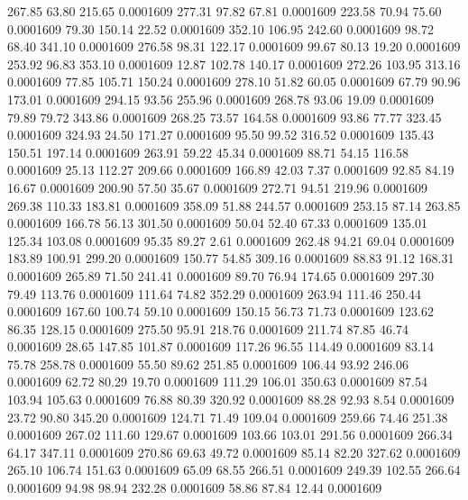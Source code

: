  267.85   63.80  215.65   0.0001609
 277.31   97.82   67.81   0.0001609
 223.58   70.94   75.60   0.0001609
  79.30  150.14   22.52   0.0001609
 352.10  106.95  242.60   0.0001609
  98.72   68.40  341.10   0.0001609
 276.58   98.31  122.17   0.0001609
  99.67   80.13   19.20   0.0001609
 253.92   96.83  353.10   0.0001609
  12.87  102.78  140.17   0.0001609
 272.26  103.95  313.16   0.0001609
  77.85  105.71  150.24   0.0001609
 278.10   51.82   60.05   0.0001609
  67.79   90.96  173.01   0.0001609
 294.15   93.56  255.96   0.0001609
 268.78   93.06   19.09   0.0001609
  79.89   79.72  343.86   0.0001609
 268.25   73.57  164.58   0.0001609
  93.86   77.77  323.45   0.0001609
 324.93   24.50  171.27   0.0001609
  95.50   99.52  316.52   0.0001609
 135.43  150.51  197.14   0.0001609
 263.91   59.22   45.34   0.0001609
  88.71   54.15  116.58   0.0001609
  25.13  112.27  209.66   0.0001609
 166.89   42.03    7.37   0.0001609
  92.85   84.19   16.67   0.0001609
 200.90   57.50   35.67   0.0001609
 272.71   94.51  219.96   0.0001609
 269.38  110.33  183.81   0.0001609
 358.09   51.88  244.57   0.0001609
 253.15   87.14  263.85   0.0001609
 166.78   56.13  301.50   0.0001609
  50.04   52.40   67.33   0.0001609
 135.01  125.34  103.08   0.0001609
  95.35   89.27    2.61   0.0001609
 262.48   94.21   69.04   0.0001609
 183.89  100.91  299.20   0.0001609
 150.77   54.85  309.16   0.0001609
  88.83   91.12  168.31   0.0001609
 265.89   71.50  241.41   0.0001609
  89.70   76.94  174.65   0.0001609
 297.30   79.49  113.76   0.0001609
 111.64   74.82  352.29   0.0001609
 263.94  111.46  250.44   0.0001609
 167.60  100.74   59.10   0.0001609
 150.15   56.73   71.73   0.0001609
 123.62   86.35  128.15   0.0001609
 275.50   95.91  218.76   0.0001609
 211.74   87.85   46.74   0.0001609
  28.65  147.85  101.87   0.0001609
 117.26   96.55  114.49   0.0001609
  83.14   75.78  258.78   0.0001609
  55.50   89.62  251.85   0.0001609
 106.44   93.92  246.06   0.0001609
  62.72   80.29   19.70   0.0001609
 111.29  106.01  350.63   0.0001609
  87.54  103.94  105.63   0.0001609
  76.88   80.39  320.92   0.0001609
  88.28   92.93    8.54   0.0001609
  23.72   90.80  345.20   0.0001609
 124.71   71.49  109.04   0.0001609
 259.66   74.46  251.38   0.0001609
 267.02  111.60  129.67   0.0001609
 103.66  103.01  291.56   0.0001609
 266.34   64.17  347.11   0.0001609
 270.86   69.63   49.72   0.0001609
  85.14   82.20  327.62   0.0001609
 265.10  106.74  151.63   0.0001609
  65.09   68.55  266.51   0.0001609
 249.39  102.55  266.64   0.0001609
  94.98   98.94  232.28   0.0001609
  58.86   87.84   12.44   0.0001609
